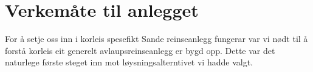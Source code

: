 \chapter{Verkemåte til anlegget}
\thispagestyle{fancy}

For å setje oss inn i korleis spesefikt Sande reinseanlegg fungerar var vi nødt til å forstå
korleis eit generelt avlaupsreinseanlegg er bygd opp. Dette var det naturlege første
steget inn mot løysningsalterntivet vi hadde valgt. 


